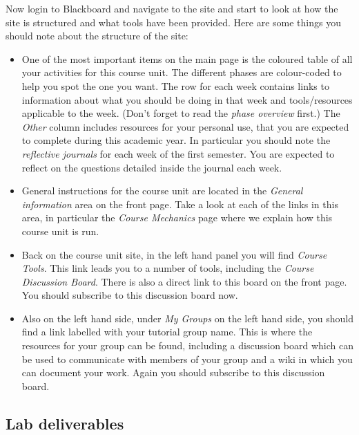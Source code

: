 \begin{firstonly}
Now login to Blackboard and navigate to the 
site and start to look at how the site is structured and what tools
have been provided. Here are some things you should note about the structure of the site:


\begin{itemize}

\item One of the most important items on the main page is the coloured
table of all your activities for this course unit. The different
phases are colour-coded to help you spot the one you want. The row for
each week contains links to information about what you should be doing
in that week and tools/resources applicable to the week. (Don't forget
to read the \emph{phase overview} first.) The \emph{Other} column
includes resources for your personal use, that you are expected to
complete during this academic year. In particular you should note the
\emph{reflective journals} for each week of the first semester. You
are expected to reflect on the questions detailed inside the journal
each week.

\item General instructions for the course unit are located in the
\emph{General information} area on the front page. Take a look
at each of the links in this area, in particular the \emph{Course
  Mechanics} page where we explain how this course unit is run. 

\item Back on the course unit site, in the left hand panel you will
find \emph{Course Tools}. This link leads you to a number of tools,
including the \emph{Course Discussion Board}. There is also a direct
link to this board on the front page. You should subscribe to this
discussion board now.

\item Also on the left hand side, under \emph{My Groups} on the left
hand side, you should find a link labelled with your tutorial group
name. This is where the resources for your group can be found, including
a discussion board which can be used to communicate with
members of your group and a wiki in which you can document your
work. Again you should subscribe to this discussion board.

\end{itemize}

\subsection{Lab deliverables}
\label{sec:lab-deliverables}


\end{firstonly}
